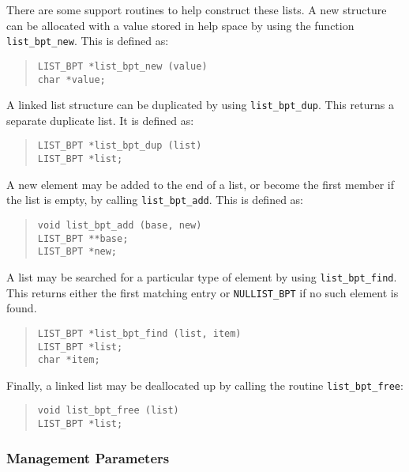 
There are some support routines to help construct these lists.
A new structure can be allocated with a value stored in help space by
using the function \verb|list_bpt_new|. This is defined as:
\begin{quote}\begin{verbatim}
LIST_BPT *list_bpt_new (value)
char *value;
\end{verbatim}\end{quote}

A linked list structure can be duplicated by using
\verb|list_bpt_dup|. This returns a separate duplicate list. It is
defined as:
\begin{quote}\begin{verbatim}
LIST_BPT *list_bpt_dup (list)
LIST_BPT *list;
\end{verbatim}\end{quote}

A new element may be added to the end of a list, or become the first
member if the list is empty, by calling \verb|list_bpt_add|. This is
defined as:
\begin{quote}\begin{verbatim}
void list_bpt_add (base, new)
LIST_BPT **base;
LIST_BPT *new;
\end{verbatim}\end{quote}

A list may be searched for a particular type of element by using
\verb|list_bpt_find|. This returns either the first matching entry or
\verb|NULLIST_BPT| if no such element is found.
\begin{quote}\begin{verbatim}
LIST_BPT *list_bpt_find (list, item)
LIST_BPT *list;
char *item;
\end{verbatim}\end{quote}

Finally, a linked list may be deallocated up by calling the routine
\verb|list_bpt_free|:
\begin{quote}\begin{verbatim}
void list_bpt_free (list)
LIST_BPT *list;
\end{verbatim}\end{quote}


\subsubsection{Management Parameters}

